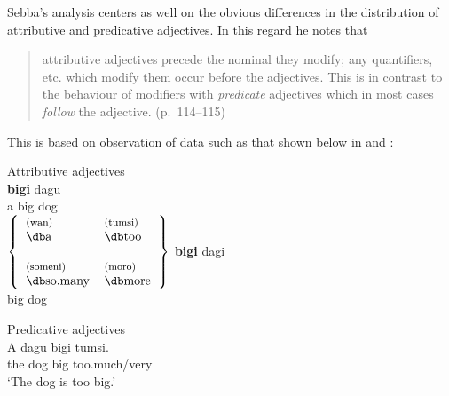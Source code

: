 Sebba’s analysis centers as well on the obvious differences in the
distribution of attributive and predicative adjectives.  In this
regard he notes that

\begin{quote}
attributive adjectives precede the nominal they modify; any
quantifiers, etc. which modify them occur before the adjectives.  This
is in contrast to the behaviour of modifiers with \textit{predicate}
adjectives which in most cases \textit{follow} the adjective. (p.~114--115)\end{quote}

This is based on observation of data such as that shown below in
 and :

\ea%
\label{ex:3:6}
Attributive adjectives \citep[115]{Sebba1986}\\
 \ea
  \textbf{bigi}  {dagu}\\
       a big dog\\

  \ex 
  $\left\{ 
	  \begin{tabular}{ll}
	  \exfont (wan) & \exfont (tumsi)\\
	  {\db}a & {\db}too \\
	  \\
	  \exfont (someni) &\exfont (moro)\\
	  {\db}so.many & {\db}more \\
	  \end{tabular}
  \right\}$
  \gll \textbf{bigi} dagi\\
  big dog\\
  \z
\z


\ea%
\label{ex:3:7}
Predicative adjectives \citep[115]{Sebba1986}\\
\ea
\gll A dagu bigi tumsi.\\
     the dog big too.much\slash very\\
\glt `The dog is too big.'

\z
\z

